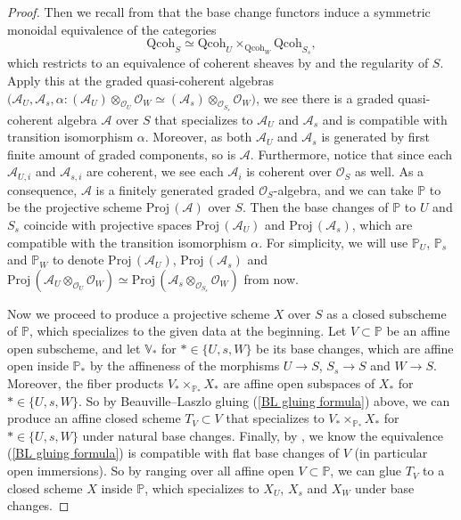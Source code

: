 \documentclass[11pt, letterpaper]{amsart}
\theoremstyle{plain}
\theoremstyle{definition}
\newcommand{\<}{\langle}
\renewcommand{\>}{\rangle}
\newcommand{\Proj}{\mathrm{Proj\,}}
\newcommand{\sO}{\mathcal{O}}
\newcommand{\sA}{\mathcal{A}}
\begin{document}
\begin{proof}
	Then we recall from \cite[Prop.~5.6.(4)]{Bha16} that the base change functors induce a symmetric monoidal equivalence of the categories
	\begin{equation}\label{BL gluing formula}
			\mathrm{Qcoh}_S \simeq \mathrm{Qcoh}_U \times_{\mathrm{Qcoh}_W} \mathrm{Qcoh}_{S_s}, 
	\end{equation}
	which restricts to an equivalence of coherent sheaves by \cite[Prop.~5.6.(2)]{Bha16} and the regularity of $S$.
	Apply this at the graded quasi-coherent algebras $\bigl(\sA_U, \sA_s, \alpha :(\sA_U)\otimes_{\sO_U} \sO_W \simeq (\sA_s)\otimes_{\sO_{S_s}} \sO_W \bigr)$,
	we see there is a graded quasi-coherent algebra $\sA$ over $S$ that specializes to $\sA_U$ and $\sA_s$ and is compatible with transition isomorphism $\alpha$.
	Moreover, as both $\sA_U$ and $\sA_s$ is generated by first finite amount of graded components, so is $\sA$.
	Furthermore, notice that since each $\sA_{U,i}$ and $\sA_{s,i}$ are coherent, we see each $\sA_i$ is coherent over $\sO_S$ as well.
	As a consequence, $\sA$ is a finitely generated graded $\sO_S$-algebra,
	and we can take $\mathbb{P}$ to be the projective scheme $\Proj(\sA)$ over $S$.
	Then the base changes of $\mathbb{P}$ to $U$ and $S_s$ coincide with projective spaces $\Proj(\sA_U)$ and $\Proj(\sA_s)$, which are compatible with the transition isomorphism $\alpha$.
	For simplicity, we will use $\mathbb{P}_U$, $\mathbb{P}_s$ and $\mathbb{P}_W$ to denote $\Proj(\sA_U)$, $\Proj(\sA_s)$ and $\Proj(\sA_U\otimes_{\sO_U} \sO_W) \simeq \Proj(\sA_s\otimes_{\sO_{S_s}} \sO_W)$ from now.
	
	Now we proceed to produce a projective scheme $X$ over $S$ as a closed subscheme of $\mathbb{P}$, which specializes to the given data at the beginning.
	Let $V\subset \mathbb{P}$ be an affine open subscheme, and let $\mathbb{V}_\ast$ for $\ast\in \{U,s, W\}$ be its base changes,
	which are affine open inside $\mathbb{P}_\ast$ by the affineness of the morphisms $U\to S$, $S_s\to S$ and $W\to S$.
	Moreover, the fiber products $V_\ast\times_{\mathbb{P}_\ast} X_\ast$ are affine open subspaces of $X_\ast$ for $\ast\in \{U,s, W\}$.
	So by Beauville--Laszlo gluing (\ref{BL gluing formula}) above, we can produce an affine closed scheme $T_V\subset V$ that specializes to $V_\ast\times_{\mathbb{P}_\ast} X_\ast$ for $\ast\in \{U,s, W\}$ under natural base changes.
	Finally, by \cite[Prop.~5.6.(6)]{Bha16}, we know the equivalence (\ref{BL gluing formula}) is compatible with flat base changes of $V$ (in particular open immersions).
	So by ranging over all affine open $V\subset \mathbb{P}$, we can glue $T_V$ to a closed scheme $X$ inside $\mathbb{P}$, which specializes to $X_U$, $X_s$ and $X_W$ under base changes.
	

\end{proof}
\end{document}
